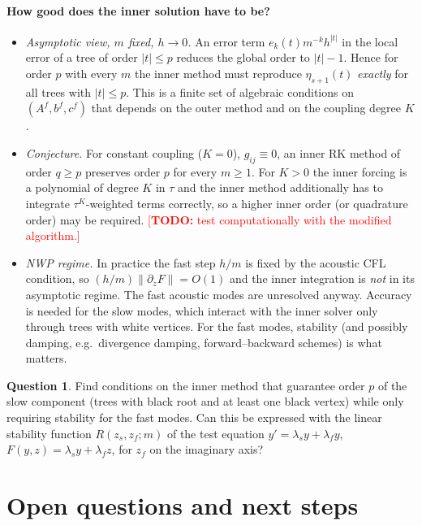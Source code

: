 \documentclass[11pt,a4paper]{article}
\theoremstyle{definition}
\newtheorem{question}{Question}
\theoremstyle{remark}
\newcommand{\todo}[1]{\textcolor{red}{[\textbf{TODO:} #1]}}
\begin{document}
\paragraph{How good does the inner solution have to be?}
\begin{itemize}
\item \emph{Asymptotic view, $m$ fixed, $h\to0$.} An error term
  $e_k(t)m^{-k}h^{|t|}$ in the local error of a tree of order $|t|\le p$
  reduces the global order to $|t|-1$. Hence for order $p$ with every
  $m$ the inner method must reproduce $\eta_{s+1}(t)$ \emph{exactly}
  for all trees with $|t|\le p$. This is a finite set of algebraic
  conditions on $(A^f,b^f,c^f)$ that depends on the outer method and on
  the coupling degree $K$.
\item \emph{Conjecture.} For constant coupling ($K=0$), $g_{ij}\equiv0$, an
  inner RK method of order $q\ge p$ preserves order $p$ for every
  $m\ge1$. For $K>0$ the inner forcing is a polynomial of degree $K$ in
  $\tau$ and the inner method additionally has to integrate
  $\tau^K$-weighted terms correctly, so a higher inner order (or
  quadrature order) may be required. \todo{test computationally with the
  modified algorithm.}
\item \emph{NWP regime.} In practice the fast step $h/m$ is fixed by the
  acoustic CFL condition, so $(h/m)\|\partial_zF\|=O(1)$ and the inner
  integration is \emph{not} in its asymptotic regime. The fast acoustic
  modes are unresolved anyway. Accuracy is needed for the slow modes,
  which interact with the inner solver only through trees with white
  vertices. For the fast modes, stability (and possibly damping, e.g.\
  divergence damping, forward--backward schemes) is what matters.
\end{itemize}

\begin{question}
Find conditions on the inner method that guarantee order $p$ of the
slow component (trees with black root and at least one black vertex)
while only requiring stability for the fast modes. Can this be expressed
with the linear stability function
$R(z_s,z_f;m)$ of the test equation $y'=\lambda_sy+\lambda_fy$,
$F(y,z)=\lambda_sy+\lambda_fz$, for $z_f$ on the imaginary axis?
\end{question}

\section{Open questions and next steps}
\label{sec:open}
\end{document}
